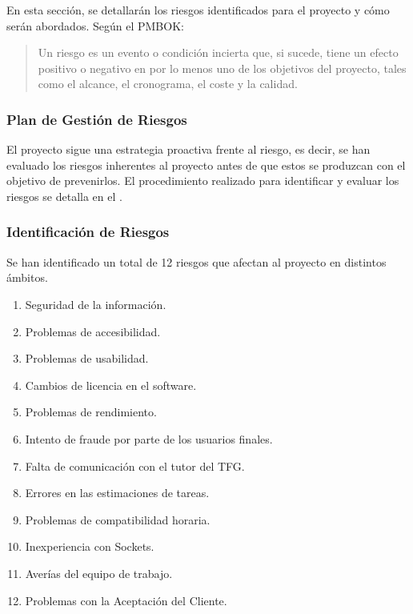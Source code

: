 En esta sección, se detallarán los riesgos identificados para el proyecto y cómo serán abordados. Según el PMBOK:
\begin{quote}
Un riesgo es un evento o condición incierta que, si sucede, tiene un efecto positivo o negativo en por lo menos uno de los objetivos del proyecto, tales como el alcance, el cronograma, el coste y la calidad. \cite{pmbok2013}
\end{quote}

\subsubsection{Plan de Gestión de Riesgos} 
El proyecto sigue una estrategia proactiva frente al riesgo, es decir, se han evaluado los riesgos inherentes al proyecto antes de que estos se produzcan con el objetivo de prevenirlos. El procedimiento realizado para identificar y evaluar los riesgos se detalla en el .


\subsubsection{Identificación de Riesgos}
Se han identificado un total de 12 riesgos que afectan al proyecto en distintos ámbitos. 
\begin{enumerate}
    \item Seguridad de la información.
    \item Problemas de accesibilidad.
    \item Problemas de usabilidad.
    \item Cambios de licencia en el software.
    \item Problemas de rendimiento.
    \item Intento de fraude por parte de los usuarios finales.
    \item Falta de comunicación con el tutor del TFG.
    \item Errores en las estimaciones de tareas.
    \item Problemas de compatibilidad horaria.
    \item Inexperiencia con Sockets.
    \item Averías del equipo de trabajo.
    \item Problemas con la Aceptación del Cliente.
\end{enumerate}

